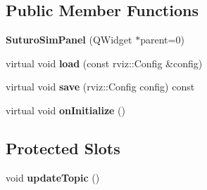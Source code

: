 \subsection*{Public Member Functions}
\begin{DoxyCompactItemize}
\item 
\hypertarget{classSuturoSim_1_1SuturoSimPanel_ac0c908bc97f767eb45964f9b7b7e49be}{{\bfseries Suturo\-Sim\-Panel} (Q\-Widget $\ast$parent=0)}\label{classSuturoSim_1_1SuturoSimPanel_ac0c908bc97f767eb45964f9b7b7e49be}

\item 
\hypertarget{classSuturoSim_1_1SuturoSimPanel_a914d811ad12b288ec3997217080c1cb1}{virtual void {\bfseries load} (const rviz\-::\-Config \&config)}\label{classSuturoSim_1_1SuturoSimPanel_a914d811ad12b288ec3997217080c1cb1}

\item 
\hypertarget{classSuturoSim_1_1SuturoSimPanel_ad5fd3fadcaefc12f0d6fda2fdb029c11}{virtual void {\bfseries save} (rviz\-::\-Config config) const }\label{classSuturoSim_1_1SuturoSimPanel_ad5fd3fadcaefc12f0d6fda2fdb029c11}

\item 
\hypertarget{classSuturoSim_1_1SuturoSimPanel_aebc9b3bbf9d91a9c9ad7ebf90ab16120}{virtual void {\bfseries on\-Initialize} ()}\label{classSuturoSim_1_1SuturoSimPanel_aebc9b3bbf9d91a9c9ad7ebf90ab16120}

\end{DoxyCompactItemize}
\subsection*{Protected Slots}
\begin{DoxyCompactItemize}
\item 
\hypertarget{classSuturoSim_1_1SuturoSimPanel_adbc55590d518d56ff3df2d68c8847d67}{void {\bfseries update\-Topic} ()}\label{classSuturoSim_1_1SuturoSimPanel_adbc55590d518d56ff3df2d68c8847d67}

\end{DoxyCompactItemize}
